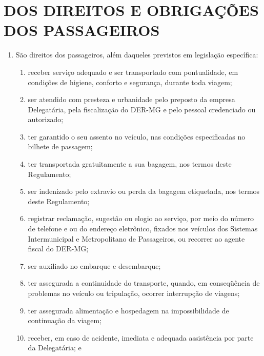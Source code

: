 \chapter{DOS DIREITOS E OBRIGAÇÕES DOS PASSAGEIROS}

\begin{enumerate}[resume, label=Art. \arabic*]

\item São direitos dos passageiros, além daqueles previstos em legislação específica:

\begin{enumerate}[label=\roman*.]

\item receber serviço adequado e ser transportado com pontualidade, em condições de higiene, conforto e segurança, durante toda viagem;

\item ser atendido com presteza e urbanidade pelo preposto da empresa Delegatária, pela fiscalização do DER-MG e pelo pessoal credenciado ou autorizado;

\item ter garantido o seu assento no veículo, nas condições especificadas no bilhete de passagem;

\item ter transportada gratuitamente a sua bagagem, nos termos deste Regulamento;

\item ser indenizado pelo extravio ou perda da bagagem etiquetada, nos termos deste Regulamento;

\item registrar reclamação, sugestão ou elogio ao serviço, por meio do número de telefone e ou do endereço eletrônico, fixados nos veículos dos Sistemas Intermunicipal e Metropolitano de Passageiros, ou recorrer ao agente fiscal do DER-MG;

\item ser auxiliado no embarque e desembarque;

\item ter assegurada a continuidade do transporte, quando, em conseqüência de problemas no veículo ou tripulação, ocorrer interrupção de viagens;

\item ter assegurada alimentação e hospedagem na impossibilidade de continuação da viagem;

\item receber, em caso de acidente, imediata e adequada assistência por parte da Delegatária; e


\end{enumerate}
\end{enumerate}
